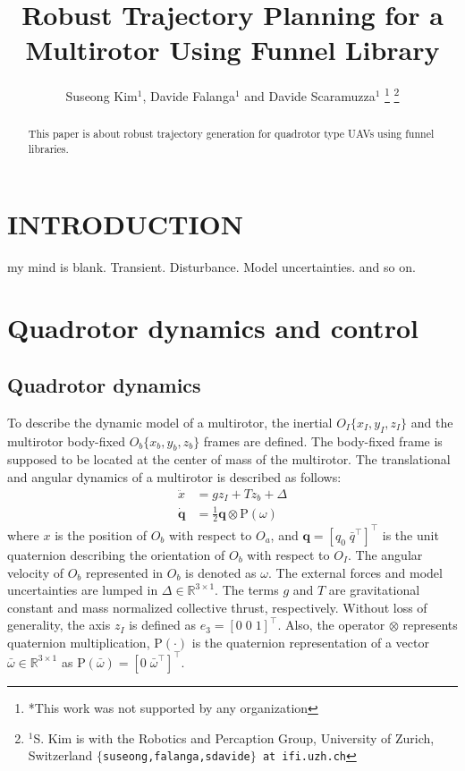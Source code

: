 \documentclass[letterpaper, 10 pt, conference]{ieeeconf}  %
\title{\LARGE \bf
Robust Trajectory Planning for a Multirotor Using Funnel Library
}
\author{Suseong Kim$^{1}$, Davide Falanga$^{1}$ and Davide Scaramuzza$^{1}$%
\thanks{*This work was not supported by any organization}%
\thanks{$^{1}$S. Kim is with the Robotics and Percaption Group, University of Zurich, Switzerland
        {\tt\small $\{$suseong,falanga,sdavide$\}$ at ifi.uzh.ch}}%
}
\begin{document}
\maketitle
\thispagestyle{empty}
\pagestyle{empty}


\begin{abstract}

This paper is about robust trajectory generation for quadrotor type UAVs using funnel libraries.

\end{abstract}


\section{INTRODUCTION}

my mind is blank.
Transient. Disturbance. Model uncertainties. and so on.

\section{Quadrotor dynamics and control}

\subsection{Quadrotor dynamics}
To describe the dynamic model of a multirotor, the inertial $O_I\{x_I,y_I,z_I\}$ and the multirotor body-fixed $O_b\{x_b,y_b,z_b\}$ frames are defined. The body-fixed frame is supposed to be located at the center of mass of the multirotor. 
The translational and angular dynamics of a multirotor is described as follows:
\begin{align}
\ddot{x} &= gz_I + Tz_b + \Delta \label{eq:translational} \\
\dot{\textbf{q}} &= \textstyle{\frac{1}{2}}\textbf{q}\otimes \text{P}(\omega) \label{eq:rotational}
\end{align}
where $x$ is the position of $O_b$ with respect to $O_a$, and $\textbf{q} = [q_0\;\bar{q}^\intercal]^\intercal$ is the unit quaternion describing the orientation of $O_b$ with respect to $O_I$.
The angular velocity of $O_b$ represented in $O_b$ is denoted as $\omega$.
The external forces and model uncertainties are lumped in $\Delta \in \mathbb{R}^{3\times 1}$. 
The terms $g$ and $T$ are gravitational constant and mass normalized collective thrust, respectively. 
Without loss of generality, the axis $z_I$ is defined as $e_3 = [0\;0\;1]^\intercal$.
Also, the operator $\otimes$ represents quaternion multiplication, $\text{P}(\cdot)$ is the quaternion representation of a vector $\bar{\omega} \in \mathbb{R}^{3\times 1}$ as $\text{P}(\bar{\omega}) = [0\;\bar{\omega}^\intercal]^\intercal$. 
\end{document}
